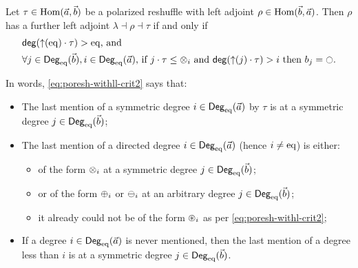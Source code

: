 \documentclass[a4paper]{memoir}
\begin{document}
\begin{theorem} \label{thm:poresh-withll}
	Let $\tau \in {\mathrm{Hom}}(\vec a, \vec b)$ be a polarized reshuffle with left adjoint $\rho \in {\mathrm{Hom}}(\vec b, \vec a)$.
	Then $\rho$ has a further left adjoint $\lambda \dashv \rho \dashv \tau$ if and only if
	\begin{align}
		&\text{$\getdeg(\sucdeg(\eqtydeg) \cdot \tau) > \eqtydeg$, and} \label{eq:poresh-withll-crit1} \\
		&\text{$\forall j \in \Degeq(\vec b), i \in \Degeq(\vec a)$, if $j \cdot \tau \leq \mixpol_i$ and $\getdeg(\sucdeg(j) \cdot \tau) > i$ then $b_j = \npolar$.} \label{eq:poresh-withll-crit2}
	\end{align}
\end{theorem}
In words, \cref{eq:poresh-withll-crit2} says that:
\begin{itemize}
	\item The last mention of a symmetric degree $i \in {\mathsf{Deg}_{\mathrm{eq}}}(\vec a)$ by $\tau$ is at a symmetric degree $j \in {\mathsf{Deg}_{\mathrm{eq}}}(\vec b)$;
	\item The last mention of a directed degree $i \in {\mathsf{Deg}_{\mathrm{eq}}}(\vec a)$ (hence $i \neq {\mathrm{eq}}$) is either:
	\begin{itemize}
		\item of the form ${\otimes}_i$ at a symmetric degree $j \in {\mathsf{Deg}_{\mathrm{eq}}}(\vec b)$;
		\item or of the form ${\oplus}_i$ or ${\ominus}_i$ at an arbitrary degree $j \in {\mathsf{Deg}_{\mathrm{eq}}}(\vec b)$;
		\item it already could not be of the form ${\oast}_i$ as per \cref{eq:poresh-withl-crit2};
	\end{itemize}
	\item If a degree $i \in {\mathsf{Deg}_{\mathrm{eq}}}(\vec a)$ is never mentioned, then the last mention of a degree less than $i$ is at a symmetric degree $j \in {\mathsf{Deg}_{\mathrm{eq}}}(\vec b)$.
\end{itemize}
\end{document}
